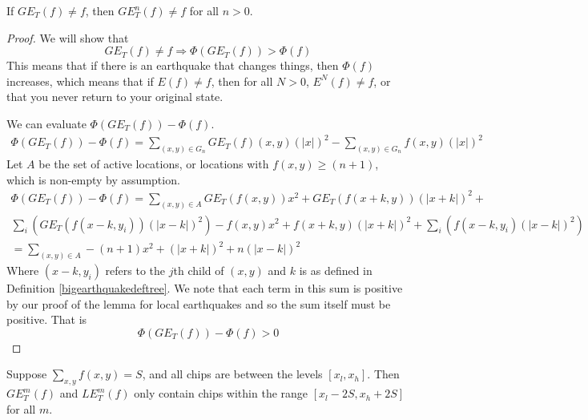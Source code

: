 \documentclass[runningheads,a4paper]{llncs}
\begin{document}
\begin{lemma}
If $GE_T(f) \neq f$, then $GE_T^n(f) \neq f$ for all $n > 0$.
\end{lemma}

\begin{proof}
We will show that 
\begin{equation}
GE_T(f) \neq f \Rightarrow \Phi(GE_T(f)) > \Phi(f)
\end{equation}
This means that if there is an earthquake that changes things, then $\Phi(f)$ increases, which means that if $E(f) \neq f$, then for all $N > 0$, $E^N(f) \neq f$, or that you never return to your original state.

We can evaluate $\Phi(GE_T(f)) - \Phi(f)$.
\begin{align}
\Phi(GE_T(f))-\Phi(f) = \sum_{(x,y) \in G_n} GE_T(f)(x,y)(|x|)^2 - \sum_{(x,y) \in G_n} f(x,y)(|x|)^2 
\end{align}
Let $A$ be the set of active locations, or locations with $f(x,y) \geq (n+1)$, which is non-empty by assumption. 
\begin{align*}
\Phi(GE_T(f)) - \Phi(f) =  \sum_{(x,y) \in A}  GE_T(f(x,y))x^2 + GE_T(f(x+k,y))(|x+k|)^2 + \\
\sum_{i} \left( GE_T(f(x-k,y_i))(|x-k|)^2 \right) -f(x,y)x^2 +f(x+k,y) (|x+k|)^2 +  \sum_{i} \left ( f(x-k,y_i) (|x-k|)^2 \right)  \\
=\sum_{(x,y) \in A} -(n+1)x^2 + (|x+k|)^2 + n(|x-k|)^2 
\end{align*}
Where $(x-k,y_i)$ refers to the $j$th child of $(x,y)$ and $k$ is as defined in Definition \ref{bigearthquakedeftree}. We note that each term in this sum is positive by our proof of the lemma for local earthquakes and so the sum itself must be positive. That is 
\begin{equation}
\Phi(GE_T(f)) - \Phi(f) > 0
\end{equation}

\end{proof}

\begin{lemma}
\label{finiteextensiontree}
Suppose $\sum_{x,y} f(x,y) = S$, and all chips are between the levels $[x_l, x_h]$. Then $GE_T^m(f)$ and $LE_T^m(f)$ only contain chips within the range $[x_l - 2S, x_h + 2S]$ for all $m$.
\end{lemma}
\end{document}
